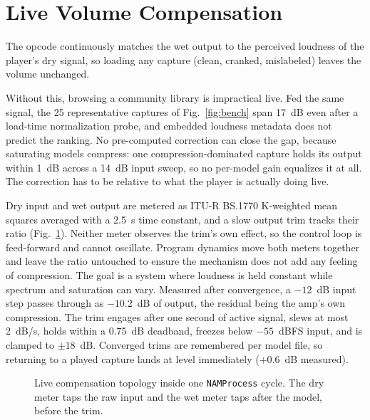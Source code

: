 \documentclass[runningheads,a4paper]{llncs}
\begin{document}
\section{Live Volume Compensation}
\label{sec:volume}

The opcode continuously matches the wet output to the perceived loudness
of the player's dry signal, so loading any capture (clean, cranked,
mislabeled) leaves the volume unchanged.

Without this, browsing a community library is impractical live. Fed the
same signal, the 25 representative captures of Fig.~\ref{fig:bench}
span 17~dB even after a load-time normalization probe, and embedded
loudness metadata does not predict the ranking. No pre-computed
correction can close the gap, because saturating models compress: one
compression-dominated capture holds its output within 1~dB across a
14~dB input sweep, so no per-model gain equalizes it at all. The
correction has to be relative to what the player is actually doing live.

Dry input and wet output are metered as ITU-R BS.1770 K-weighted mean
squares averaged with a 2.5~s time constant, and a slow output trim tracks
their ratio (Fig.~\ref{fig:comp}). Neither meter observes the trim's
own effect, so the control loop is feed-forward and cannot oscillate. Program dynamics move both meters together and leave the
ratio untouched to ensure the mechanism does not add any feeling of compression. The goal is a system where loudness is held constant while spectrum and saturation can vary. Measured after convergence, a $-12$~dB input step passes through as $-10.2$~dB of output,
the residual being the amp's own compression. The trim engages after one
second of active signal, slews at most 2~dB/s, holds within a 0.75~dB
deadband, freezes below $-55$~dBFS input, and is clamped to $\pm 18$~dB.
Converged trims are remembered per model file, so returning to a played capture lands at level immediately ($+0.6$~dB measured). 

\begin{figure}
\centering
{}
\caption{Live compensation topology inside one \texttt{NAMProcess}
cycle. The dry meter taps the raw input and the wet meter taps after the model, before the trim.}
\label{fig:comp}
\end{figure}
\end{document}
